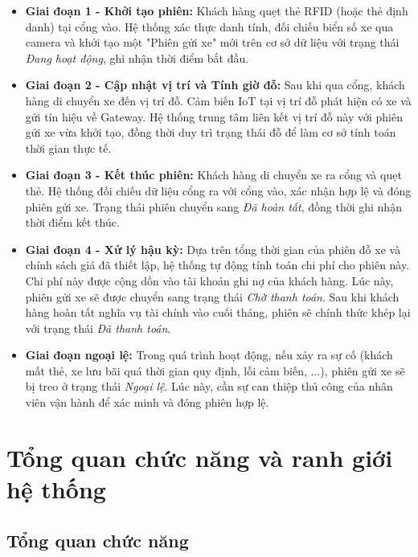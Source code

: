 \documentclass[a4paper,12pt]{article}
\begin{document}
\begin{itemize}
    \item \textbf{Giai đoạn 1 - Khởi tạo phiên:} Khách hàng quẹt thẻ RFID (hoặc thẻ định danh) tại cổng vào. Hệ thống xác thực danh tính, đối chiếu biển số xe qua camera và khởi tạo một "Phiên gửi xe" mới trên cơ sở dữ liệu với trạng thái \textit{Đang hoạt động}, ghi nhận thời điểm bắt đầu.
    
    \item \textbf{Giai đoạn 2 - Cập nhật vị trí và Tính giờ đỗ:} Sau khi qua cổng, khách hàng di chuyển xe đến vị trí đỗ. Cảm biến IoT tại vị trí đỗ phát hiện có xe và gửi tín hiệu về Gateway. Hệ thống trung tâm liên kết vị trí đỗ này với phiên gửi xe vừa khởi tạo, đồng thời duy trì trạng thái đỗ để làm cơ sở tính toán thời gian thực tế.
    
    \item \textbf{Giai đoạn 3 - Kết thúc phiên:} Khách hàng di chuyển xe ra cổng và quẹt thẻ. Hệ thống đối chiếu dữ liệu cổng ra với cổng vào, xác nhận hợp lệ và đóng phiên gửi xe. Trạng thái phiên chuyển sang \textit{Đã hoàn tất}, đồng thời ghi nhận thời điểm kết thúc.
    
        \item \textbf{Giai đoạn 4 - Xử lý hậu kỳ:} Dựa trên tổng thời gian của phiên đỗ xe và chính sách giá đã thiết lập, 
    hệ thống tự động tính toán chi phí cho phiên này. Chi phí này được cộng dồn vào tài khoản ghi nợ của khách hàng. 
    Lúc này, phiên gửi xe sẽ được chuyển sang trạng thái \textit{Chờ thanh toán}. Sau khi khách hàng hoàn tất nghĩa vụ tài chính vào cuối tháng, phiên sẽ chính thức khép lại với trạng thái \textit{Đã thanh toán}.

    \item \textbf{Giai đoạn ngoại lệ: } Trong quá trình hoạt động, nếu xảy ra sự cố (khách mất thẻ, xe lưu bãi quá thời gian quy định, lỗi cảm biến, ...), phiên gửi xe sẽ bị treo ở trạng thái \textit{Ngoại lệ}. 
    Lúc này, cần sự can thiệp thủ công của nhân viên vận hành để xác minh và đóng phiên hợp lệ.
\end{itemize}



\section{Tổng quan chức năng và ranh giới hệ thống}
\subsection{Tổng quan chức năng}
\end{document}
